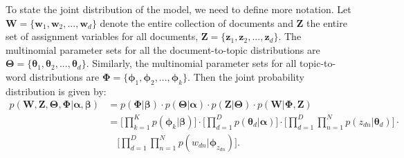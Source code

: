 To state the joint distribution of the model, we need to define more notation. Let $\boldsymbol{W}=\{\boldsymbol{w}_1, \boldsymbol{w}_2, ..., \boldsymbol{w}_d\}$ denote the entire collection of documents and $\boldsymbol{Z}$ the entire set of assignment variables for all documents, $\boldsymbol{Z} = \{\boldsymbol{z}_1, \boldsymbol{z}_2, ..., \boldsymbol{z}_d\}$. The multinomial parameter sets for all the document-to-topic distributions are $\boldsymbol{\Theta}=\{\boldsymbol{\theta}_{1}, \boldsymbol{\theta}_{2}, ..., \boldsymbol{\theta}_{d}\}$. Similarly, the multinomial parameter sets for all topic-to-word distributions are $\boldsymbol{\Phi}=\{\boldsymbol{\phi}_1, \boldsymbol{\phi}_2, ..., \boldsymbol{\phi}_k\}$. Then the joint probability distribution is given by:
\begin{equation}
\begin{aligned}
p(\boldsymbol{W}, \boldsymbol{Z}, \boldsymbol{\Theta}, \boldsymbol{\Phi} \vert \boldsymbol{\alpha}, \boldsymbol{\beta}) &= p(\boldsymbol{\Phi} \vert \boldsymbol{\beta}) \cdot p(\boldsymbol{\Theta} \vert \boldsymbol{\alpha}) \cdot p(\boldsymbol{Z} \vert \boldsymbol{\Theta}) \cdot  p(\boldsymbol{W} \vert \boldsymbol{\Phi}, \boldsymbol{Z}) \\
                                                                                                                                                                                          &= \Bigg[\prod_{k=1}^{K} p(\boldsymbol{\phi}_k \vert \boldsymbol{\beta})\Bigg] \cdot \Bigg[\prod_{d=1}^{D} p(\boldsymbol{\theta}_d \vert \boldsymbol{\alpha})\Bigg] \cdot \Bigg[\prod_{d=1}^{D} \prod_{n=1}^{N} p(z_{dn} \vert \boldsymbol{\theta}_d)\Bigg] \cdot \\
                                                                                                                                                                                           &\quad \Bigg[\prod_{d=1}^{D} \prod_{n=1}^{N} p(w_{dn} \vert \boldsymbol{\phi}_{z_{dn}})\Bigg].
\end{aligned}
\label{eq:background-lda-full-joint}
\end{equation}

